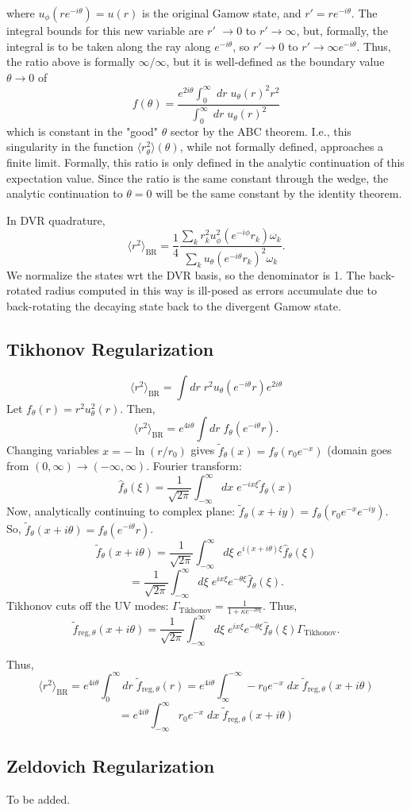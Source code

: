 where $u_\phi(re^{-i\theta}) = u(r)$ is the original Gamow state, and $r'=re^{-i\theta}$. The integral bounds for this new variable are $r'$ $\rightarrow 0$ to $r'\rightarrow\infty$, but, formally, the integral is to be taken along the ray along $e^{-i\theta}$, so $r'\rightarrow 0$ to $r'\rightarrow \infty e^{-i\theta}$. Thus, the ratio above is formally $\infty/\infty$, but it is well-defined as the boundary value $\theta\rightarrow0$ of 
$$
f(\theta)=\frac{e^{2i\theta}\int^\infty_0\;dr\;u_\theta(r)^2r^2}{\int_0^\infty\;dr\; u_\theta(r)^2}
$$
which is constant in the "good" $\theta$ sector by the ABC theorem. I.e., this singularity in the function $\langle r^2_\theta\rangle(\theta)$, while not formally defined, approaches a finite limit. Formally, this ratio is only defined in the analytic continuation of this expectation value. Since the ratio is the same constant through the wedge, the analytic continuation to $\theta=0$ will be the same constant by the identity theorem.

In DVR quadrature,
$$
\langle r^2 \rangle_{\text{BR}} = \frac{1}{4}\frac{\sum_k r_k^2 u_\phi^2 (e^{-i\phi}r_k) \omega_k}{\sum_k u_\theta(e^{-i\theta}r_k)^2\omega_k}.
$$
We normalize the states wrt the DVR basis, so the denominator is 1. The back-rotated radius computed in this way is ill-posed as errors accumulate due to back-rotating the decaying state back to the divergent Gamow state.
\subsection{Tikhonov Regularization}

$$
\langle r^2 \rangle_{\text{BR}} = \int dr\; r^2 u_\theta(e^{-i\theta}r)e^{2i\theta}
$$
Let $f_\theta(r) = r^2 u^2_\theta(r)$. Then, 
$$
\langle r^2 \rangle_{\text{BR}} = e^{4i\theta}\int dr\; f_\theta(e^{-i\theta} r).
$$
Changing variables $x=-\ln(r/r_0)$ gives $\tilde{f}_\theta(x)=f_\theta(r_0e^{-x})$ (domain goes from $(0, \infty)\rightarrow (-\infty,\infty)$. Fourier transform:
$$
\hat{f}_\theta(\xi) = \frac{1}{\sqrt{2\pi}} \int_{-\infty}^\infty dx\; e^{-ix\xi}\tilde{f}_\theta(x)
$$
Now, analytically continuing to complex plane: $\tilde{f}_\theta(x+iy)=f_\theta(r_0e^{-x}e^{-iy})$. So, $\tilde{f}_\theta(x+i\theta) = f_\theta(e^{-i\theta}r)$.
$$
\tilde{f}_\theta(x + i\theta) = \frac{1}{\sqrt{2\pi}} \int_{-\infty}^\infty d\xi\; e^{i(x+i\theta)\xi}\hat{f}_\theta(\xi)
$$
$$
= \frac{1}{\sqrt{2\pi}} \int_{-\infty}^\infty d\xi\; e^{ix\xi}e^{-\theta\xi}\hat{f}_\theta(\xi).
$$
Tikhonov cuts off the UV modes: $\Gamma_{\text{Tikhonov}} = \frac{1}{1+\kappa e^{-2\theta\xi}}$. Thus,
$$
\tilde{f}_{\text{reg},\theta}(x + i\theta)=  \frac{1}{\sqrt{2\pi}} \int_{-\infty}^\infty d\xi\; e^{ix\xi}e^{-\theta\xi}\hat{f}_\theta(\xi)\Gamma_{\text{Tikhonov}}.
$$

Thus,
$$
\langle r^2\rangle_{\text{BR}} = e^{4i\theta} \int_0^\infty dr \;\tilde{f}_{\text{reg},\theta}(r) = e^{4i\theta}\int_\infty^{-\infty}-r_0e^{-x}\;dx\;\tilde{f}_{\text{reg},\theta}(x+i\theta)
$$
$$
= e^{4i\theta}\int_{-\infty}^{\infty}r_0e^{-x}\;dx\;\tilde{f}_{\text{reg},\theta}(x+i\theta)
$$
\subsection{Zeldovich Regularization}
To be added.
